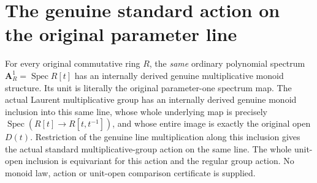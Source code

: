 \section{The genuine standard action on the original parameter line}
\label{sec:native-parameter-line-monoid}

\begin{theorem}
\label{thm:native-parameter-line-monoid}
\leanok
For every original commutative ring $R$, the \emph{same}
ordinary polynomial spectrum $\mathbf A^1_R=\operatorname{Spec}R[t]$
has an internally derived genuine multiplicative monoid
structure. Its unit is literally the original parameter-one
spectrum map. The actual Laurent multiplicative group has
an internally derived genuine monoid inclusion into this
same line, whose whole underlying map is precisely
$\operatorname{Spec}(R[t]\to R[t,t^{-1}])$, and whose entire
image is exactly the original open $D(t)$.
Restriction of the genuine line multiplication along this
inclusion gives the actual standard multiplicative-group
action on the same line. The whole unit-open inclusion is
equivariant for this action and the regular group action.
No monoid law, action or unit-open comparison certificate is supplied.
\end{theorem}

